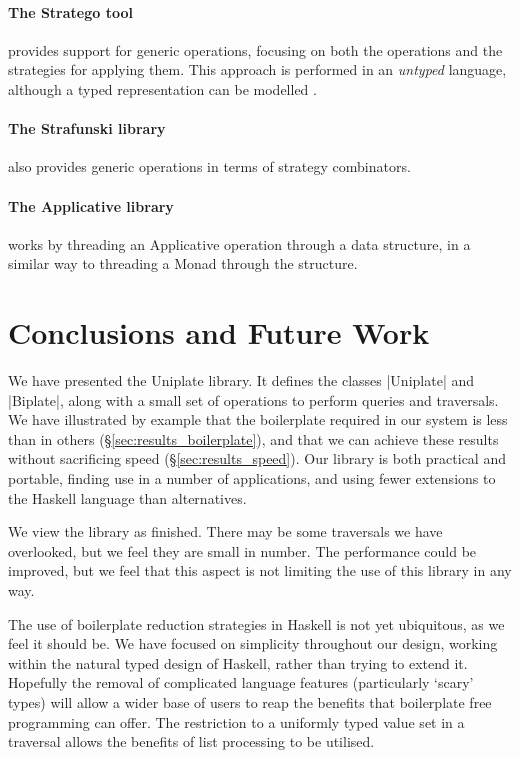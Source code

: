 \documentclass[preprint]{sigplanconf}
\begin{document}
\paragraph{The Stratego tool} \citep{stratego} provides support for generic operations, focusing on both the operations and the strategies for applying them. This approach is performed in an \textit{untyped} language, although a typed representation can be modelled \cite{lammel:typed_generic_strategies}.

\paragraph{The Strafunski library} \citep{lammel:polymorphic_symphony} also provides generic operations in terms of strategy combinators.

\paragraph{The Applicative library} \citep{mcbride:applicative} works by threading an Applicative operation through a data structure, in a similar way to threading a Monad through the structure.


\section{Conclusions and Future Work}
\label{sec:conclusion}

We have presented the Uniplate library. It defines the classes |Uniplate| and |Biplate|, along with a small set of operations to perform queries and traversals. We have illustrated by example that the boilerplate required in our system is less than in others (\S\ref{sec:results_boilerplate}), and that we can achieve these results without sacrificing speed (\S\ref{sec:results_speed}). Our library is both practical and portable, finding use in a number of applications, and using fewer extensions to the Haskell language than alternatives.

We view the library as finished. There may be some traversals we have overlooked, but we feel they are small in number. The performance could be improved, but we feel that this aspect is not limiting the use of this library in any way.

The use of boilerplate reduction strategies in Haskell is not yet ubiquitous, as we feel it should be. We have focused on simplicity throughout our design, working within the natural typed design of Haskell, rather than trying to extend it. Hopefully the removal of complicated language features (particularly `scary' types) will allow a wider base of users to reap the benefits that boilerplate free programming can offer. The restriction to a uniformly typed value set in a traversal allows the benefits of list processing to be utilised.
\end{document}
